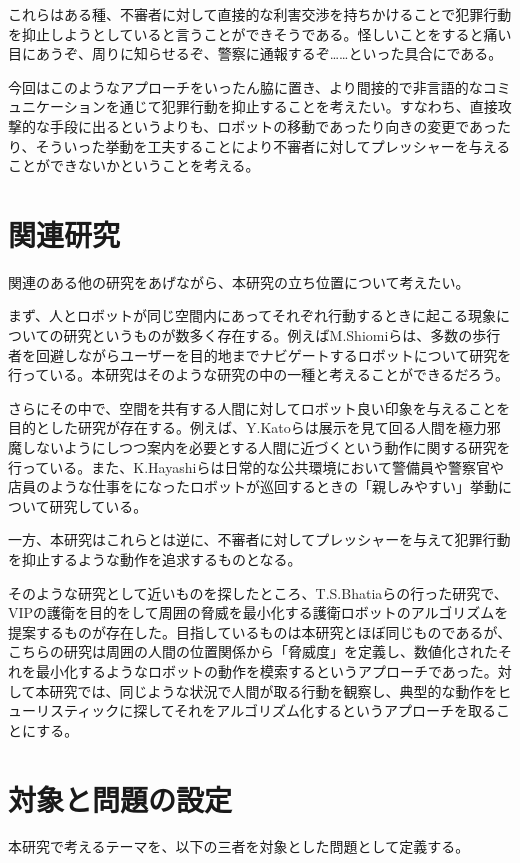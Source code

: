 \documentclass{kuisthesis}
\begin{document}
これらはある種、不審者に対して直接的な利害交渉を持ちかけることで犯罪行動を抑止しようとしていると言うことができそうである。怪しいことをすると痛い目にあうぞ、周りに知らせるぞ、警察に通報するぞ……といった具合にである。

今回はこのようなアプローチをいったん脇に置き、より間接的で非言語的なコミュニケーションを通じて犯罪行動を抑止することを考えたい。すなわち、直接攻撃的な手段に出るというよりも、ロボットの移動であったり向きの変更であったり、そういった挙動を工夫することにより不審者に対してプレッシャーを与えることができないかということを考える。


\section{関連研究}
関連のある他の研究をあげながら、本研究の立ち位置について考えたい。

まず、人とロボットが同じ空間内にあってそれぞれ行動するときに起こる現象についての研究というものが数多く存在する。例えばM.Shiomiらは、多数の歩行者を回避しながらユーザーを目的地までナビゲートするロボットについて研究を行っている\cite{1}。本研究はそのような研究の中の一種と考えることができるだろう。

さらにその中で、空間を共有する人間に対してロボット良い印象を与えることを目的とした研究が存在する。例えば、Y.Katoらは展示を見て回る人間を極力邪魔しないようにしつつ案内を必要とする人間に近づくという動作に関する研究\cite{2}を行っている。また、K.Hayashiらは日常的な公共環境において警備員や警察官や店員のような仕事をになったロボットが巡回するときの「親しみやすい」挙動について研究している\cite{3}。

一方、本研究はこれらとは逆に、不審者に対してプレッシャーを与えて犯罪行動を抑止するような動作を追求するものとなる。

そのような研究として近いものを探したところ、T.S.Bhatiaらの行った研究で、VIPの護衛を目的をして周囲の脅威を最小化する護衛ロボットのアルゴリズムを提案するもの\cite{4}が存在した。目指しているものは本研究とほぼ同じものであるが、こちらの研究\cite{3}は周囲の人間の位置関係から「脅威度」を定義し、数値化されたそれを最小化するようなロボットの動作を模索するというアプローチであった。対して本研究では、同じような状況で人間が取る行動を観察し、典型的な動作をヒューリスティックに探してそれをアルゴリズム化するというアプローチを取ることにする。

\section{対象と問題の設定}
本研究で考えるテーマを、以下の三者を対象とした問題として定義する。
\end{document}
